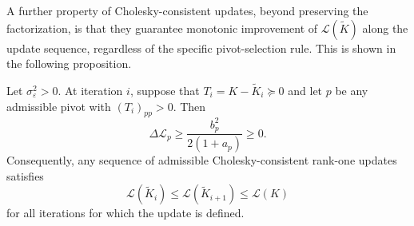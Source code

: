 \documentclass[onefignum,onetabnum]{siamart250211}
\begin{document}
A further property of Cholesky-consistent updates, beyond preserving the factorization, is that they guarantee monotonic improvement of $\mathcal{L}(\widetilde{K})$ along the update sequence, regardless of the specific pivot-selection rule. This is shown in the following proposition. 

\begin{proposition}[Monotonicity]
    \label{lem:monotone}
    Let $\sigma_\varepsilon^2>0$. At iteration $i$, suppose that
    $T_i=K-\widetilde K_i\succeq 0$ and let $p$ be any admissible pivot
    with $(T_i)_{pp}>0$. Then
    \begin{equation}
        \Delta\mathcal{L}_p
        \geq
        \frac{b_p^2}{2(1+a_p)}
        \geq 0.
        \label{eq:DeltaLowerBound}
    \end{equation}
    Consequently, any sequence of admissible Cholesky-consistent rank-one updates satisfies
    \begin{equation}
        \mathcal{L}(\widetilde{K}_{i})
        \leq
        \mathcal{L}(\widetilde{K}_{i+1})
        \leq
        \mathcal{L}(K)
        \label{eq:VFEmonoSeq}
    \end{equation}
    for all iterations for which the update is defined.
\end{proposition}
\end{document}
